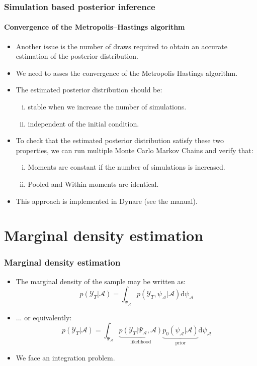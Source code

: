 \documentclass[10pt,slidestop]{beamer}
\newcommand{\sample}{\mathcal Y_T}
\begin{document}
\begin{frame}
  \frametitle{Simulation based posterior inference}
  \framesubtitle{Convergence of the Metropolis--Hastings algorithm}
  \begin{itemize}
  \item Another issue is the number of draws required to obtain
    an accurate estimation of the posterior distribution.
  \item We need to asses the convergence of the Metropolis
    Hastings algorithm.
  \item The estimated posterior distribution should be:
    {\footnotesize
      \begin{enumerate}[(i)]
      \item stable when we increase the number of simulations.
      \item independent of the initial condition.
      \end{enumerate}}
  \item To check that the estimated posterior distribution
    satisfy these two properties, we can run multiple
    Monte Carlo Markov Chains  and verify that:
    {\footnotesize
      \begin{enumerate}[(i)]
      \item Moments are constant if the number of simulations is increased.
      \item Pooled and Within moments are identical.
      \end{enumerate}}
  \item This approach is implemented in Dynare (see the manual).
  \end{itemize}
\end{frame}


\section{Marginal density estimation}

\begin{frame}
  \frametitle{Marginal density estimation}
  \begin{itemize}
  \item The marginal density of the sample may be written as:
    \[
    p(\sample|\mathcal{A}) = \int_{\Psi_{\mathcal{A}}}
    p(\sample,\psi_{\mathcal{A}}|\mathcal{A})\mathrm d\psi_{\mathcal{A}}
    \]
    \bigskip
  \item ... or equivalently:
    \[
    p(\sample|\mathcal{A}) = \int_{\Psi_{\mathcal{A}}}
    \underbrace{p(\sample|\Psi_{\mathcal{A}},\mathcal{A})}_{\text{likelihood}}
    \underbrace{p_0(\psi_{\mathcal{A}}|\mathcal{A})}_{\text{prior}}\mathrm d\psi_{\mathcal{A}}
    \]
    \bigskip
  \item We face an integration problem.
  \end{itemize}

\end{frame}
\end{document}
